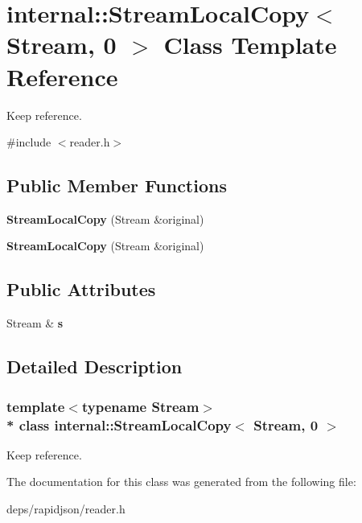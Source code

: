 \hypertarget{classinternal_1_1_stream_local_copy_3_01_stream_00_010_01_4}{}\section{internal\+:\+:Stream\+Local\+Copy$<$ Stream, 0 $>$ Class Template Reference}
\label{classinternal_1_1_stream_local_copy_3_01_stream_00_010_01_4}


Keep reference.  




{\ttfamily \#include $<$reader.\+h$>$}

\subsection*{Public Member Functions}
\begin{DoxyCompactItemize}
\item 
{\bfseries Stream\+Local\+Copy} (Stream \&original)\hypertarget{classinternal_1_1_stream_local_copy_3_01_stream_00_010_01_4_ac684a7be07d79d6ddd274dc1150f4b79}{}\label{classinternal_1_1_stream_local_copy_3_01_stream_00_010_01_4_ac684a7be07d79d6ddd274dc1150f4b79}

\item 
{\bfseries Stream\+Local\+Copy} (Stream \&original)\hypertarget{classinternal_1_1_stream_local_copy_3_01_stream_00_010_01_4_ac684a7be07d79d6ddd274dc1150f4b79}{}\label{classinternal_1_1_stream_local_copy_3_01_stream_00_010_01_4_ac684a7be07d79d6ddd274dc1150f4b79}

\end{DoxyCompactItemize}
\subsection*{Public Attributes}
\begin{DoxyCompactItemize}
\item 
Stream \& {\bfseries s}\hypertarget{classinternal_1_1_stream_local_copy_3_01_stream_00_010_01_4_af0474c97cc24e685f1953988086ac71a}{}\label{classinternal_1_1_stream_local_copy_3_01_stream_00_010_01_4_af0474c97cc24e685f1953988086ac71a}

\end{DoxyCompactItemize}


\subsection{Detailed Description}
\subsubsection*{template$<$typename Stream$>$\\*
class internal\+::\+Stream\+Local\+Copy$<$ Stream, 0 $>$}

Keep reference. 

The documentation for this class was generated from the following file\+:\begin{DoxyCompactItemize}
\item 
deps/rapidjson/reader.\+h\end{DoxyCompactItemize}
